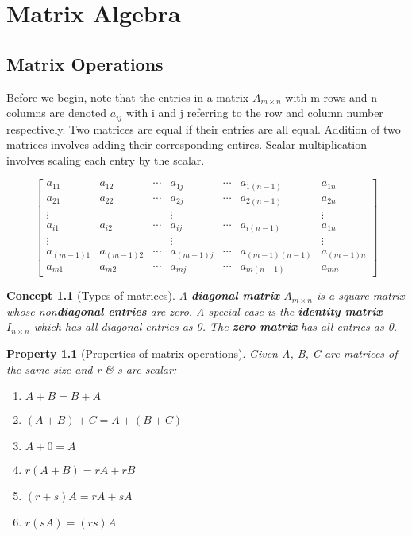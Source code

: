 \documentclass[12pt]{report}
\newtheorem{cpt}{Concept}
\newtheorem{prop}{Property}
\newcommand{\mtx}[3]{$#1_{#2\times #3}$}
\begin{document}
\chapter{Matrix Algebra}
\section{Matrix Operations}
Before we begin, note that the entries in a matrix \mtx{A}{m}{n} with m rows and n columns are denoted $a_{ij}$ with i and j referring to the row and column number respectively. Two matrices are equal if their entries are all equal. Addition of two matrices involves adding their corresponding entires. Scalar multiplication involves scaling each entry by the scalar.

\begin{equation}
\begin{bmatrix}
a_{11} & a_{12} & \cdots & a_{1j} & \cdots & a_{1(n-1)} & a_{1n} \\
a_{21} & a_{22} & \cdots & a_{2j} & \cdots & a_{2(n-1)} & a_{2n} \\
\vdots & & & \vdots & & & \vdots \\
a_{i1} & a_{i2} & \cdots & a_{ij} & \cdots & a_{i(n-1)} & a_{1n} \\
\vdots & & & \vdots & & & \vdots \\
a_{(m-1)1} & a_{(m-1)2} & \cdots & a_{(m-1)j} & \cdots & a_{(m-1)(n-1)} & a_{(m-1)n} \\
a_{m1} & a_{m2} & \cdots & a_{mj} & \cdots & a_{m(n-1)} & a_{mn}
\end{bmatrix}
\end{equation}

\begin{cpt}[Types of matrices]

A \textbf{diagonal matrix} $A_{m\times n}$ is a square matrix whose non\textbf{diagonal entries} are zero. A special case is the \textbf{identity matrix} $I_{n\times n}$ which has all diagonal entries as 0. The \textbf{zero matrix} has all entries as 0.
\end{cpt}

\begin{prop}[Properties of matrix operations]

Given A, B, C are matrices of the same size and r \& s are scalar:

\begin{enumerate}
\item[Commutative] $A+B=B+A$
\item[Associative] $(A+B)+C=A+(B+C)$
\item[Identity] $A+0=A$
\item[Scalar Distributive] $r(A+B)=rA+rB$
\item $(r+s)A=rA+sA$
\item[Scalar associative] $r(sA)= (rs)A$
\end{enumerate}
\end{prop}
\end{document}
